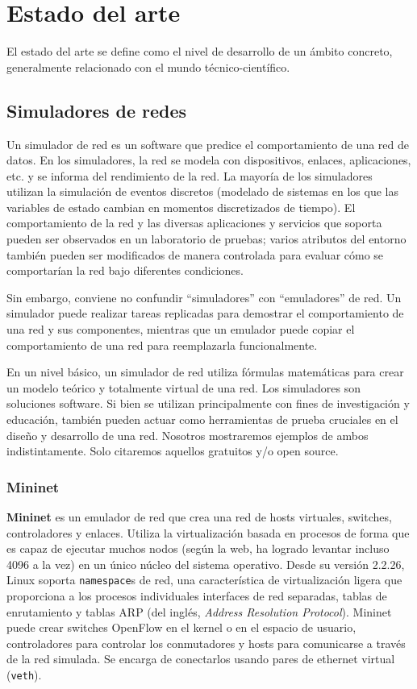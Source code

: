 \chapter{Estado del arte}\label{chap:ArtState}

El estado del arte se define como el nivel de desarrollo de un ámbito concreto, generalmente relacionado con el mundo técnico-científico.

\section{Simuladores de redes}
Un simulador de red es un software que predice el comportamiento de una red de datos. En los simuladores, la red se modela con dispositivos, enlaces, aplicaciones, etc. y se informa del rendimiento de la red. La mayoría de los simuladores utilizan la simulación de eventos discretos (modelado de sistemas en los que las variables de estado cambian en momentos discretizados de tiempo). El comportamiento de la red y las diversas aplicaciones y servicios que soporta pueden ser observados en un laboratorio de pruebas; varios atributos del entorno también pueden ser modificados de manera controlada para evaluar cómo se comportarían la red bajo diferentes condiciones\cite{wiki:Network_simulation}.

Sin embargo, conviene no confundir ``simuladores'' con ``emuladores'' de red. Un simulador puede realizar tareas replicadas para demostrar el comportamiento de una red y sus componentes, mientras que un emulador puede copiar el comportamiento de una red para reemplazarla funcionalmente\cite{emsim}.

En un nivel básico, un simulador de red utiliza fórmulas matemáticas para crear un modelo teórico y totalmente virtual de una red. Los simuladores son soluciones software. Si bien se utilizan principalmente con fines de investigación y educación, también pueden actuar como herramientas de prueba cruciales en el diseño y desarrollo de una red. Nosotros mostraremos ejemplos de ambos indistintamente. Solo citaremos aquellos gratuitos y/o open source.

\subsection{Mininet}
\textbf{Mininet} es un emulador de red que crea una red de hosts virtuales, switches, controladores y enlaces. Utiliza la virtualización basada en procesos de forma que es capaz de ejecutar muchos nodos (según la web, ha logrado levantar incluso 4096 a la vez) en un único núcleo del sistema operativo. Desde su versión 2.2.26, Linux soporta \texttt{namespace}s de red, una característica de virtualización ligera que proporciona a los procesos individuales interfaces de red separadas, tablas de enrutamiento y tablas ARP (del inglés, \textit{Address Resolution Protocol}). Mininet puede crear switches OpenFlow en el kernel o en el espacio de usuario, controladores para controlar los conmutadores y hosts para comunicarse a través de la red simulada. Se encarga de conectarlos usando pares de ethernet virtual (\texttt{veth})\cite{mininet}.

